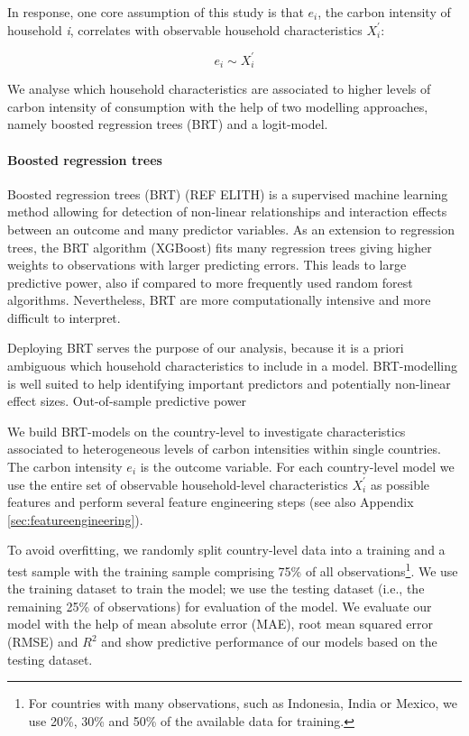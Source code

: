 \documentclass[12pt, a4paper]{article}
\begin{document}
In response, one core assumption of this study is that $e_{i}$, the carbon intensity of household \textit{i}, correlates with observable household characteristics $X_{i}^{'}$:

\begin{equation}
    e_{i} \sim X_{i}^{'}
\end{equation}


We analyse which household characteristics are associated to higher levels of carbon intensity of consumption with the help of two modelling approaches, namely boosted regression trees (BRT) and a logit-model.

\paragraph{Boosted regression trees} Boosted regression trees (BRT) (REF ELITH) is a supervised machine learning method allowing for detection of non-linear relationships and interaction effects between an outcome and many predictor variables. As an extension to regression trees, the BRT algorithm (XGBoost) fits many regression trees giving higher weights to observations with larger predicting errors. This leads to large predictive power, also if compared to more frequently used random forest algorithms. Nevertheless, BRT are more computationally intensive and  more difficult to interpret. %

Deploying BRT serves the purpose of our analysis, because it is a priori ambiguous which household characteristics to include in a model. BRT-modelling is well suited to help identifying important predictors and potentially non-linear effect sizes. Out-of-sample predictive power

We build BRT-models on the country-level to investigate characteristics associated to heterogeneous levels of carbon intensities within single countries. The carbon intensity $e_{i}$ is the outcome variable. For each country-level model we use the entire set of observable household-level characteristics $X_{i}^{'}$ as possible features and perform several feature engineering steps (see also Appendix \ref{sec:featureengineering}).

To avoid overfitting, we randomly split country-level data into a training and a test sample with the training sample comprising 75\% of all observations\footnote{For countries with many observations, such as Indonesia, India or Mexico, we use 20\%, 30\% and 50\% of the available data for training.}. We use the training dataset to train the model; we use the testing dataset (i.e., the remaining 25\% of observations) for evaluation of the model. We evaluate our model with the help of mean absolute error (MAE), root mean squared error (RMSE) and $R^{2}$ and show predictive performance of our models based on the testing dataset.
\end{document}
